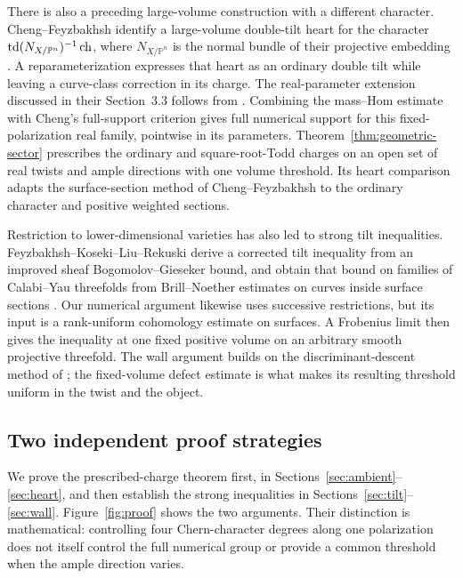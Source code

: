 There is also a preceding large-volume construction with a different
character. Cheng--Feyzbakhsh identify a large-volume double-tilt heart for
the character $\operatorname{td}(N_{X/\mathbb P^n})^{-1}\operatorname{ch}$, where $N_{X/\mathbb P^n}$
is the normal bundle of their projective embedding
\cite[Section~3]{ChengFeyzbakhsh2026}. A reparameterization expresses
that heart as an ordinary double tilt while leaving a curve-class
correction in its charge.
The real-parameter extension discussed in their Section~3.3 follows from
\cite[Theorem~4.1, Proposition~4.5 and Theorem~6.2]{LiEtAl2026}.
Combining the mass--Hom estimate
\cite[Theorem~7.5]{LiEtAl2026} with Cheng's full-support criterion
\cite[Theorem~2.1]{Cheng2026} gives full numerical support for this
fixed-polarization real family, pointwise in its parameters.
Theorem~\ref{thm:geometric-sector} prescribes the ordinary and
square-root-Todd charges on an open set of real twists and ample
directions with one volume threshold. Its heart comparison adapts the
surface-section method of Cheng--Feyzbakhsh to the ordinary character
and positive weighted sections.

Restriction to lower-dimensional varieties has also led to strong tilt
inequalities. Feyzbakhsh--Koseki--Liu--Rekuski derive a corrected tilt
inequality from an improved sheaf Bogomolov--Gieseker bound, and obtain
that bound on families of Calabi--Yau threefolds from Brill--Noether
estimates on curves inside surface sections
\cite[Theorems~1.1, 1.3 and~1.4]{FeyzbakhshEtAl2025}.
Our numerical argument likewise uses successive restrictions, but its
input is a rank-uniform cohomology estimate on surfaces. A Frobenius
limit then gives the inequality at one fixed positive volume on an
arbitrary smooth projective threefold. The wall argument builds on the
discriminant-descent method of
\cite[Lemma~2.7]{BMSZ2017}; the fixed-volume defect estimate is what
makes its resulting threshold uniform in the twist and the object.

\subsection{Two independent proof strategies}

We prove the prescribed-charge theorem first, in
Sections~\ref{sec:ambient}--\ref{sec:heart}, and then establish the
strong inequalities in
Sections~\ref{sec:tilt}--\ref{sec:wall}. Figure~\ref{fig:proof} shows
the two arguments. Their distinction is mathematical: controlling four
Chern-character degrees along one polarization does not itself control
the full numerical group or provide a common threshold when the ample
direction varies.

